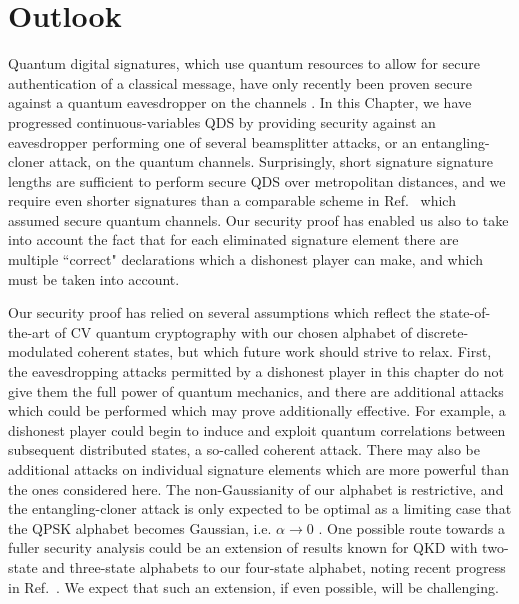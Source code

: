 \clearpage
\section{Outlook}
Quantum digital signatures, which use quantum resources to allow for secure authentication of a classical message, have only recently been proven secure against a quantum eavesdropper on the channels \cite{Amiri2016, Puthoor2016, Yin2016}. In this Chapter, we have progressed continuous-variables QDS by providing security against an eavesdropper performing one of several beamsplitter attacks, or an entangling-cloner attack, on the quantum channels. Surprisingly, short signature signature lengths are sufficient to perform secure QDS over metropolitan distances, and we require even shorter signatures than a comparable scheme in Ref.~\cite{Croal2016} which assumed secure quantum channels. Our security proof has enabled us also to take into account the fact that for each eliminated signature element there are multiple ``correct" declarations which a dishonest player can make, and which must be taken into account.

Our security proof has relied on several assumptions which reflect the state-of-the-art of CV quantum cryptography with our chosen alphabet of discrete-modulated coherent states, but which future work should strive to relax. First, the eavesdropping attacks permitted by a dishonest player in this chapter do not give them the full power of quantum mechanics, and there are additional attacks which could be performed which may prove additionally effective. For example, a dishonest player could begin to induce and exploit quantum correlations between subsequent distributed states, a so-called coherent attack. There may also be additional attacks on individual signature elements which are more powerful than the ones considered here. The non-Gaussianity of our alphabet is restrictive, and the entangling-cloner attack is only expected to be optimal as a limiting case that the QPSK alphabet becomes Gaussian, i.e. $\alpha \rightarrow 0$ \cite{Navascues2006, Garcia-Patron2006}. One possible route towards a fuller security analysis could be an extension of results known for QKD with two-state \cite{Zhao2009} and three-state \cite{Bradler2018} alphabets to our four-state alphabet, noting recent progress in Ref.~\cite{Papanastasiou2018}. We expect that such an extension, if even possible, will be challenging.

